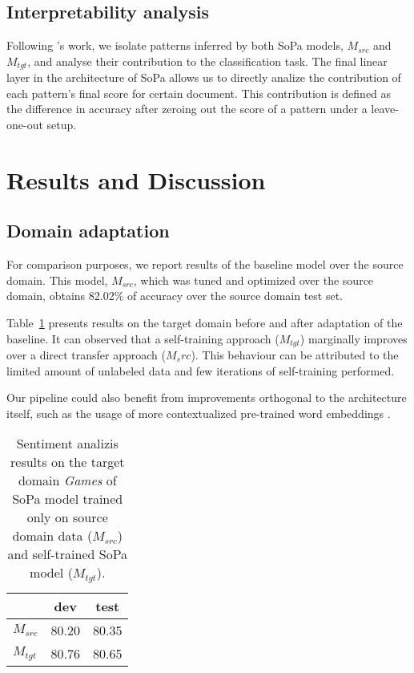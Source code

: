 \documentclass[11pt,a4paper]{article}
\begin{document}
\subsection{Interpretability analysis}
Following \citet{schwartz2018sopa}'s work, we isolate patterns inferred by both {\sc SoPa} models, $M_{src}$ and $M_{tgt}$, and analyse their contribution to the classification task.
The final linear layer in the architecture of {\sc SoPa} allows us to directly analize the contribution of each pattern's final score for certain document.
This contribution is defined as the difference in accuracy after zeroing out the score of a pattern under a leave-one-out setup.


\section{Results and Discussion}

\subsection{Domain adaptation}
For comparison purposes, we report results of the baseline model over the source domain.
This model, $M_{src}$, which was tuned and optimized over the source domain, obtains 82.02\% of accuracy over the source domain test set.

Table~\ref{table:tgt-res} presents results on the target domain before and after adaptation of the baseline.
It can observed that a self-training approach  ($M_{tgt}$) marginally improves over a direct transfer approach ($M_src$).
This behaviour can be attributed to the limited amount of unlabeled data and few iterations of self-training performed.

Our pipeline could also benefit from improvements orthogonal  to the architecture itself, such as the usage of more contextualized pre-trained word embeddings \cite{Peters:2018,devlin2018bert}.

\begin{table}[]
\centering
\begin{tabular}{|l|c|c|}
\hline
  & dev   & test  \\ \hline
$M_{src}$ & 80.20 & 80.35 \\ \hline
$M_{tgt}$ & 80.76 & 80.65 \\ \hline
\end{tabular}
\caption{Sentiment analizis results on the target domain {\it Games} of {\sc SoPa} model trained only on source domain data ($M_{src}$) and self-trained {\sc SoPa} model ($M_{tgt}$).}
\label{table:tgt-res}
\end{table}
\end{document}
